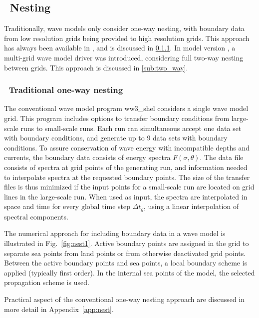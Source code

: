 \vssub
\subsection{~Nesting}
\vssub

Traditionally, wave models only consider one-way nesting, with boundary data
from low resolution grids being provided to high resolution grids. This
approach has always been available in \ws, and is discussed in
\para\ref{sub:one_way}. In model version \WWver, a multi-grid wave model
driver was introduced, considering full two-way nesting between grids. This
approach is discussed in \para\ref{sub:two_way}.


\vssub
\subsubsection{~Traditional one-way nesting} \label{sub:one_way}
\vssub

The conventional wave model program {\file ww3\_shel} considers a single wave
model grid. This program includes options to transfer boundary conditions from
large-scale runs to small-scale runs. Each run can simultaneous accept one
data set with boundary conditions, and generate up to 9 data sets with
boundary conditions. To assure conservation of wave energy with incompatible
depths and currents, the boundary data consists of energy spectra
$F(\sigma,\theta)$. The data file consists of spectra at grid points of the
generating run, and information needed to interpolate spectra at the requested
boundary points. The size of the transfer files is thus minimized if the input
points for a small-scale run are located on grid lines in the large-scale
run. When used as input, the spectra are interpolated in space and time for
every global time step $\Delta t_g$, using a linear interpolation of spectral
components. 

The numerical approach for including boundary data in a wave model is
illustrated in Fig.~\ref{fig:nest1}. Active boundary points are assigned in
the grid to separate sea points from land points or from otherwise deactivated
grid points. Between the active boundary points and sea points, a local
boundary scheme is applied (typically first order). In the internal sea points
of the model, the selected propagation scheme is used.

Practical aspect of the conventional one-way nesting approach are
discussed in more detail in Appendix~\ref{app:nest}.

